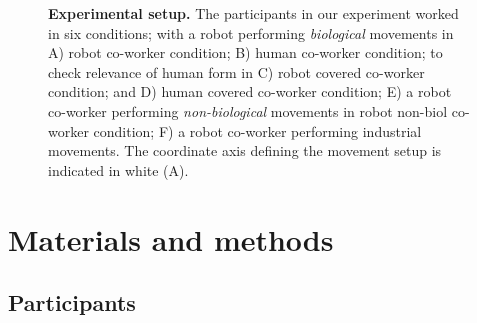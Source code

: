 \documentclass[a4paper, 12pt, oneside]{Thesis}  %
\begin{document}
\begin{figure}[b]
	\caption{{\bf Experimental setup.} The participants in our experiment worked in six conditions; with a robot performing \textit{biological} movements in A) robot co-worker condition; B) human co-worker condition; to check relevance of  human form in C) robot covered co-worker condition; and D) human covered co-worker condition; E) a robot co-worker performing \textit{non-biological} movements in robot non-biol co-worker condition; F) a robot co-worker performing industrial movements. The coordinate axis defining the movement setup is indicated in white (A).}
	\label{fig:setup1}
\end{figure}


\clearpage
\section{Materials and methods} \label{methods}

\subsection{Participants}
\end{document}
